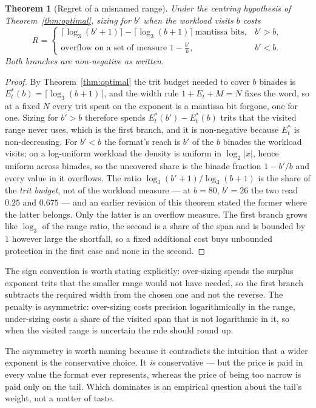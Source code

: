 \documentclass[11pt]{article}
\newtheorem{theorem}{Theorem}
\theoremstyle{definition}
\begin{document}
\begin{theorem}[Regret of a misnamed range]
\label{thm:regret}
Under the centring hypothesis of Theorem~\ref{thm:optimal}, sizing for $b'$ when
the workload visits $b$ costs
\[
  R =
  \begin{cases}
    \lceil\log_3(b'+1)\rceil - \lceil\log_3(b+1)\rceil \ \text{mantissa bits}, & b' > b,\\[2pt]
    \text{overflow on a set of measure } 1 - \tfrac{b'}{b}, & b' < b .
  \end{cases}
\]
Both branches are non-negative as written.
\end{theorem}

\begin{proof}
By Theorem~\ref{thm:optimal} the trit budget needed to cover $b$ binades is
$E_t^{*}(b) = \lceil\log_3(b+1)\rceil$, and the width rule $1 + E_t + M = N$ fixes
the word, so at a fixed $N$ every trit spent on the exponent is a mantissa bit
forgone, one for one. Sizing for $b' > b$ therefore spends
$E_t^{*}(b') - E_t^{*}(b)$ trits that the visited range never uses, which is the
first branch, and it is non-negative because $E_t^{*}$ is non-decreasing. For
$b' < b$ the format's reach is $b'$ of the $b$ binades the workload visits; on a
log-uniform workload the density is uniform in $\log_2|x|$, hence uniform across
binades, so the uncovered share is the binade fraction $1 - b'/b$ and every value
in it overflows. The ratio $\log_3(b'+1)/\log_3(b+1)$ is the share of the
\emph{trit budget}, not of the workload measure --- at $b = 80$, $b' = 26$ the two
read $0.25$ and $0.675$ --- and an earlier revision of this theorem stated the
former where the latter belongs. Only the latter is an overflow measure. The first
branch grows like $\log_3$ of the range ratio, the second is a share of the span
and is bounded by $1$ however large the shortfall, so a fixed additional cost buys
unbounded protection in the first case and none in the second.
\end{proof}

The sign convention is worth stating explicitly: over-sizing spends the surplus
exponent trits that the smaller range would not have needed, so the first branch
subtracts the required width from the chosen one and not the reverse. The penalty
is asymmetric: over-sizing costs precision logarithmically in the range,
under-sizing costs a share of the visited span that is not logarithmic in it, so
when the visited range is uncertain the rule should round up.

The asymmetry is worth naming because it contradicts the intuition that a wider
exponent is the conservative choice. It \emph{is} conservative --- but the price is
paid in every value the format ever represents, whereas the price of being too
narrow is paid only on the tail. Which dominates is an empirical question about
the tail's weight, not a matter of taste.
\end{document}
